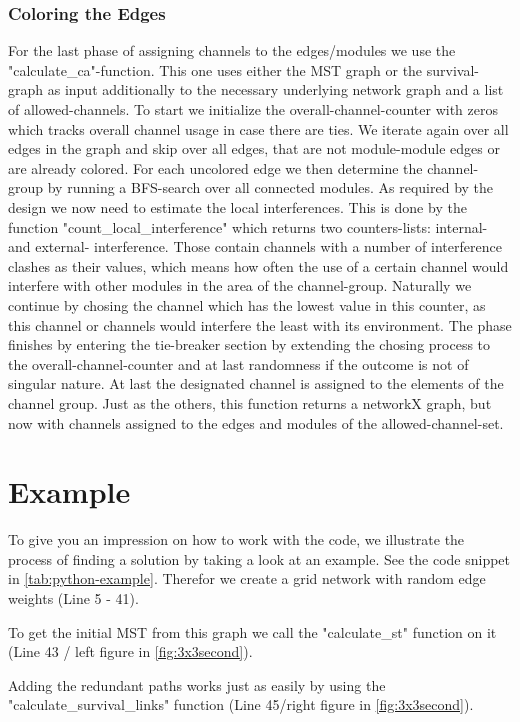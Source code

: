       \subsubsection{Coloring the Edges}
	For the last phase of assigning channels to the edges/modules we use the "calculate\_ca"-function. This one uses either the MST graph or the survival-graph as input additionally
	to the necessary underlying network graph and a list of allowed-channels.
	To start we initialize the overall-channel-counter with zeros which tracks overall channel usage in case there are ties.
	We iterate again over all edges in the graph and skip over all edges, that are not module-module edges or are already colored. 
	For each uncolored edge we then determine the channel-group by running a BFS-search over all connected modules.
	As required by the design we now need to estimate the local interferences.
	This is done by the function "count\_local\_interference" which returns two counters-lists: internal- and external- interference.
	Those contain channels with a number of interference clashes as their values, which means how often the use of a certain channel would interfere with other modules 
	in the area of the channel-group. Naturally we continue by chosing the channel which has the lowest value in this counter, as this channel or channels would interfere the least
	with its environment. The phase finishes by entering the tie-breaker section by extending the chosing process to the overall-channel-counter and at last randomness if
	the outcome is not of singular nature.
	At last the designated channel is assigned to the elements of the channel group.
	Just as the others, this function returns a networkX graph, but now with channels assigned to the edges and modules of the allowed-channel-set.	

  \section{Example}
    To give you an impression on how to work with the code, we illustrate the process of finding a solution by taking a look at an example.
    See the code snippet in \ref{tab:python-example}.
    Therefor we create a grid network with random edge weights (Line 5 - 41).

    To get the initial MST from this graph we call the "calculate\_st" function on it (Line 43 / left figure in \ref{fig:3x3second}).
    
    Adding the redundant paths works just as easily by using the "calculate\_survival\_links" function (Line 45/right figure in \ref{fig:3x3second}).
    
